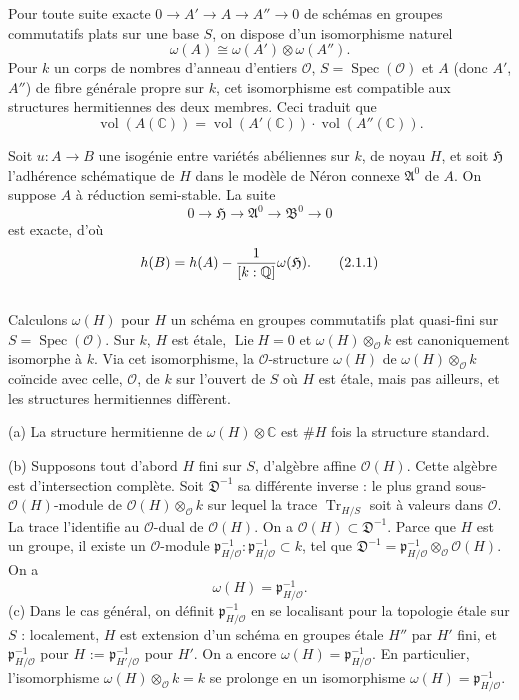 \documentclass[12pt,a4paper]{article}
\theoremstyle{plain}
\theoremstyle{definition}
\theoremstyle{remark}
\DeclareMathOperator{\Spec}{Spec}
\DeclareMathOperator{\Lie}{Lie}
\DeclareMathOperator{\Tr}{Tr}
\DeclareMathOperator{\vol}{vol}
\newcommand{\CC}{\mathbb{C}}
\newcommand{\QQ}{\mathbb{Q}}
\newcommand{\cO}{\mathcal{O}}
\newcommand{\fA}{\mathfrak{A}}
\let\deg\relax
\providecommand{\CC}{\mathbb{C}}
\providecommand{\QQ}{\mathbb{Q}}
\providecommand{\cO}{\mathcal{O}}
\providecommand{\fA}{\mathfrak{A}}
\providecommand{\fB}{\mathfrak{B}}
\providecommand{\fD}{\mathfrak{D}}
\providecommand{\fH}{\mathfrak{H}}
\providecommand{\Spec}{\operatorname{Spec}}
\providecommand{\fp}{\mathfrak{p}}
\providecommand{\Lie}{\operatorname{Lie}}
\providecommand{\Tr}{\operatorname{Tr}}
\begin{document}
Pour toute suite exacte $0 \to A' \to A \to A'' \to 0$ de schémas en groupes commutatifs plats sur une base $S$, on dispose d'un isomorphisme naturel
\[
\omega(A) \cong \omega(A') \otimes \omega(A'').
\]
Pour $k$ un corps de nombres d'anneau d'entiers $\cO$, $S = \Spec(\cO)$ et $A$ (donc $A'$, $A''$) de fibre générale propre sur $k$, cet isomorphisme est compatible aux structures hermitiennes des deux membres. Ceci traduit que
\[
\vol(A(\CC)) = \vol(A'(\CC)) \cdot \vol(A''(\CC)).
\]

Soit $u : A \to B$ une isogénie entre variétés abéliennes sur $k$, de noyau $H$, et soit $\fH$ l'adhérence schématique de $H$ dans le modèle de Néron connexe $\fA^0$ de $A$. On suppose $A$ à réduction semi-stable. La suite
\[
0 \to \fH \to \fA^0 \to \fB^0 \to 0
\]
est exacte, d'où
\[
h(B) = h(A) - \frac{1}{[k:\QQ]} \deg \omega(\fH). \tag{2.1.1}
\]

\subsection{}

Calculons $\omega(H)$ pour $H$ un schéma en groupes commutatifs plat quasi-fini sur $S = \Spec(\cO)$. Sur $k$, $H$ est étale, $\Lie H = 0$ et $\omega(H) \otimes_{\cO} k$ est canoniquement isomorphe à $k$. Via cet isomorphisme, la $\cO$-structure $\omega(H)$ de $\omega(H) \otimes_{\cO} k$ coïncide avec celle, $\cO$, de $k$ sur l'ouvert de $S$ où $H$ est étale, mais pas ailleurs, et les structures hermitiennes diffèrent.

(a) La structure hermitienne de $\omega(H) \otimes \CC$ est $\#H$ fois la structure standard.

(b) Supposons tout d'abord $H$ fini sur $S$, d'algèbre affine $\cO(H)$. Cette algèbre est d'intersection complète. Soit $\fD^{-1}$ sa différente inverse : le plus grand sous-$\cO(H)$-module de $\cO(H) \otimes_{\cO} k$ sur lequel la trace $\Tr_{H/S}$ soit à valeurs dans $\cO$. La trace l'identifie au $\cO$-dual de $\cO(H)$. On a $\cO(H) \subset \fD^{-1}$. Parce que $H$ est un groupe, il existe un $\cO$-module $\fp_{H/\cO}^{-1} : \fp_{H/\cO}^{-1} \subset k$, tel que $\fD^{-1} = \fp_{H/\cO}^{-1} \otimes_{\cO} \cO(H)$. On a
\[
\omega(H) = \fp_{H/\cO}^{-1}.
\]
(c) Dans le cas général, on définit $\fp_{H/\cO}^{-1}$ en se localisant pour la topologie étale sur $S$ : localement, $H$ est extension d'un schéma en groupes étale $H''$ par $H'$ fini, et $\fp_{H/\cO}^{-1}$ pour $H$ := $\fp_{H'/\cO}^{-1}$ pour $H'$. On a encore $\omega(H) = \fp_{H/\cO}^{-1}$. En particulier, l'isomorphisme $\omega(H) \otimes_{\cO} k = k$ se prolonge en un isomorphisme $\omega(H) = \fp_{H/\cO}^{-1}$.
\end{document}
